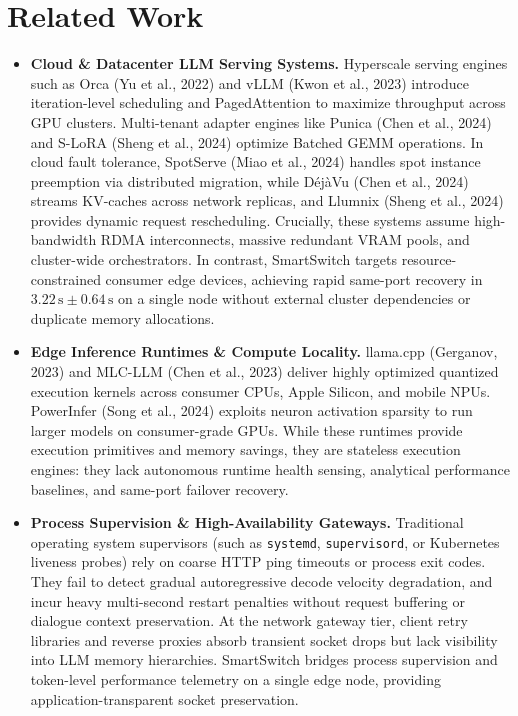 \documentclass[11pt,a4paper]{article}
\newcommand{\su}{\,\mathrm{s}}
\newcommand{\code}[1]{\texttt{#1}}
\begin{document}
\section{Related Work}\label{sec:related}
\begin{itemize}[leftmargin=*]
\item \textbf{Cloud \& Datacenter LLM Serving Systems.} Hyperscale serving engines such as Orca (Yu et al., 2022) and vLLM (Kwon et al., 2023) introduce iteration-level scheduling and PagedAttention to maximize throughput across GPU clusters. Multi-tenant adapter engines like Punica (Chen et al., 2024) and S-LoRA (Sheng et al., 2024) optimize Batched GEMM operations. In cloud fault tolerance, SpotServe (Miao et al., 2024) handles spot instance preemption via distributed migration, while D\'ej\`aVu (Chen et al., 2024) streams KV-caches across network replicas, and Llumnix (Sheng et al., 2024) provides dynamic request rescheduling. Crucially, these systems assume high-bandwidth RDMA interconnects, massive redundant VRAM pools, and cluster-wide orchestrators. In contrast, SmartSwitch targets resource-constrained consumer edge devices, achieving rapid same-port recovery in $3.22\su \pm 0.64\su$ on a single node without external cluster dependencies or duplicate memory allocations.

\item \textbf{Edge Inference Runtimes \& Compute Locality.} llama.cpp (Gerganov, 2023) and MLC-LLM (Chen et al., 2023) deliver highly optimized quantized execution kernels across consumer CPUs, Apple Silicon, and mobile NPUs. PowerInfer (Song et al., 2024) exploits neuron activation sparsity to run larger models on consumer-grade GPUs. While these runtimes provide execution primitives and memory savings, they are stateless execution engines: they lack autonomous runtime health sensing, analytical performance baselines, and same-port failover recovery.

\item \textbf{Process Supervision \& High-Availability Gateways.} Traditional operating system supervisors (such as \code{systemd}, \code{supervisord}, or Kubernetes liveness probes) rely on coarse HTTP ping timeouts or process exit codes. They fail to detect gradual autoregressive decode velocity degradation, and incur heavy multi-second restart penalties without request buffering or dialogue context preservation. At the network gateway tier, client retry libraries and reverse proxies absorb transient socket drops but lack visibility into LLM memory hierarchies. SmartSwitch bridges process supervision and token-level performance telemetry on a single edge node, providing application-transparent socket preservation.


\end{itemize}
\end{document}
